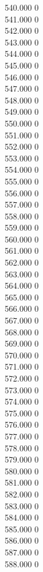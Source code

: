 { 540.000	0 \\
 541.000	0 \\
 542.000	0 \\
 543.000	0 \\
 544.000	0 \\
 545.000	0 \\
 546.000	0 \\
 547.000	0 \\
 548.000	0 \\
 549.000	0 \\
 550.000	0 \\
 551.000	0 \\
 552.000	0 \\
 553.000	0 \\
 554.000	0 \\
 555.000	0 \\
 556.000	0 \\
 557.000	0 \\
 558.000	0 \\
 559.000	0 \\
 560.000	0 \\
 561.000	0 \\
 562.000	0 \\
 563.000	0 \\
 564.000	0 \\
 565.000	0 \\
 566.000	0 \\
 567.000	0 \\
 568.000	0 \\
 569.000	0 \\
 570.000	0 \\
 571.000	0 \\
 572.000	0 \\
 573.000	0 \\
 574.000	0 \\
 575.000	0 \\
 576.000	0 \\
 577.000	0 \\
 578.000	0 \\
 579.000	0 \\
 580.000	0 \\
 581.000	0 \\
 582.000	0 \\
 583.000	0 \\
 584.000	0 \\
 585.000	0 \\
 586.000	0 \\
 587.000	0 \\
 588.000	0 \\
}

